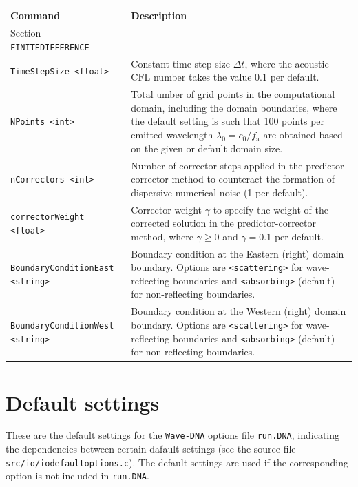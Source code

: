 \noindent
\begin{longtable}{p{} p{}}
\textbf{Command} & \textbf{Description}
\vspace{1mm} \\
\hline Section {\tt FINITEDIFFERENCE} &\\ \hline
{\tt TimeStepSize <float>} & Constant time step size $\Delta t$, where the acoustic $\mathrm{CFL}$ number takes the value 0.1 per default. \\
{\tt NPoints <int>} & Total umber of grid points in the computational domain, including the domain boundaries, where the default setting is such that 100 points per emitted wavelength $\lambda_0 = c_0/f_{\mathrm{a}}$ are obtained based on the given or default domain size. \\
{\tt nCorrectors <int>} & Number of corrector steps applied in the predictor-corrector method to counteract the formation of dispersive numerical noise (1 per default). \\
{\tt correctorWeight <float>} & Corrector weight $\gamma$ to specify the weight of the corrected solution in the predictor-corrector method, where $\gamma\ge0$ and $\gamma=0.1$ per default.\\
{\tt BoundaryConditionEast <string>} & Boundary condition at the Eastern (right) domain boundary. Options are {\tt <scattering>} for wave-reflecting boundaries and {\tt <absorbing>} (default) for non-reflecting boundaries. \\
{\tt BoundaryConditionWest <string>} & Boundary condition at the Western (right) domain boundary. Options are {\tt <scattering>} for wave-reflecting boundaries and {\tt <absorbing>} (default) for non-reflecting boundaries. \\
\hline
\end{longtable} \vspace{1em}




\section{Default settings}
\label{sec:Default settings}

These are the default settings for the {\tt Wave-DNA} options file {\tt run.DNA}, indicating the dependencies between certain dafault settings (see the source file {\tt src/io/iodefaultoptions.c}). The default settings are used if the corresponding option is not included in {\tt run.DNA}.

